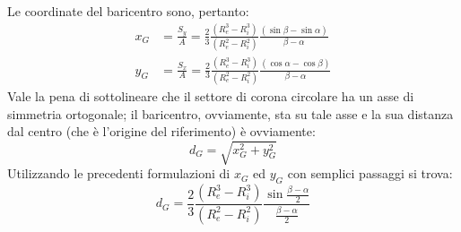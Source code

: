 Le coordinate del baricentro sono, pertanto: 
\begin{align*} 
x_G    &= \frac{S_y}{A} = \frac{2}{3} \frac{(R_e^3-R_i^3)}{(R_e^2-R_i^2)}\frac{(\sin\beta-\sin\alpha)}{\beta-\alpha}  \\
y_G    &= \frac{S_x}{A} = \frac{2}{3} \frac{(R_e^3-R_i^3)}{(R_e^2-R_i^2)}\frac{(\cos\alpha-\cos\beta)}{\beta-\alpha}
\end{align*}
Vale la pena di sottolineare che il settore di corona circolare ha un asse di simmetria ortogonale; il baricentro, ovviamente, sta su tale asse e la sua distanza dal centro (che è l'origine del riferimento) è ovviamente:%
\begin{equation*}
d_G = \sqrt{x_G^2+y_G^2}
\end{equation*}
Utilizzando le precedenti formulazioni di $x_G$ ed $y_G$ con semplici passaggi si trova:
\begin{equation*}
d_G = \frac{2}{3}\frac{(R_e^3-R_i^3)}{(R_e^2-R_i^2)}\frac{\sin\frac{\beta-\alpha}{2}}{\frac{\beta-\alpha}{2}}
\end{equation*}
\clearpage
